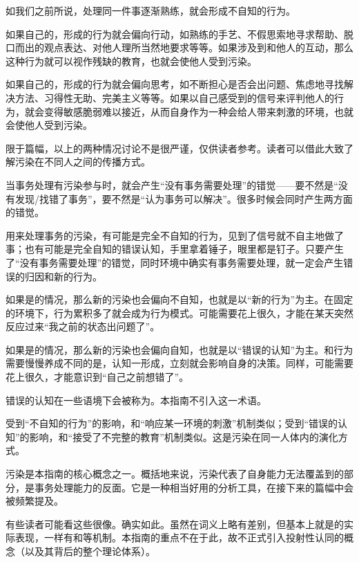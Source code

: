 \begin{explain}
如我们之前所说，处理同一件事逐渐熟练，就会形成不自知的行为。

如果自己的，形成的行为就会偏向行动，如熟练的手艺、不假思索地寻求帮助、脱口而出的观点表达、对他人理所当然地要求等等。如果涉及到和他人的互动，那么这种行为就可以视作残缺的教育，也就会使他人受到污染。

如果自己的，形成的行为就会偏向思考，如不断担心是否会出问题、焦虑地寻找解决方法、习得性无助、完美主义等等。如果以自己感受到的信号来评判他人的行为，就会变得敏感脆弱难以接近，从而自身作为一种会给人带来刺激的环境，也就会使他人受到污染。

限于篇幅，以上的两种情况讨论不是很严谨，仅供读者参考。读者可以借此大致了解污染在不同人之间的传播方式。
\end{explain}
\begin{explain}
当事务处理有污染参与时，就会产生“没有事务需要处理”的错觉——要不然是“没有发现/找错了事务”，要不然是“认为事务可以解决”。很多时候会同时产生两方面的错觉。

用来处理事务的污染，有可能是完全不自知的行为，见到了信号就不自主地做了事；也有可能是完全自知的错误认知，手里拿着锤子，眼里都是钉子。只要产生了“没有事务需要处理”的错觉，同时环境中确实有事务需要处理，就一定会产生错误的归因和新的行为。

如果是的情况，那么新的污染也会偏向不自知，也就是以“新的行为”为主。在固定的环境下，行为累积多了就会成为行为模式。可能需要花上很久，才能在某天突然反应过来“我之前的状态出问题了”。

如果是的情况，那么新的污染也会偏向自知，也就是以“错误的认知”为主。和行为需要慢慢养成不同的是，认知一形成，立刻就会影响自身的决策。同样，可能需要花上很久，才能意识到“自己之前想错了”。

错误的认知在一些语境下会被称为。本指南不引入这一术语。

受到“不自知的行为”的影响，和“响应某一环境的刺激”机制类似；受到“错误的认知”的影响，和“接受了不完整的教育”机制类似。这是污染在同一人体内的演化方式。
\end{explain}
污染是本指南的核心概念之一。概括地来说，污染代表了自身能力无法覆盖到的部分，是事务处理能力的反面。它是一种相当好用的分析工具，在接下来的篇幅中会被频繁提及。
\begin{explain}
有些读者可能看这些很像。确实如此。虽然在词义上略有差别，但基本上就是的实际表现，一样有和等机制。本指南的重点不在于此，故不正式引入投射性认同的概念（以及其背后的整个理论体系）。
\end{explain}

